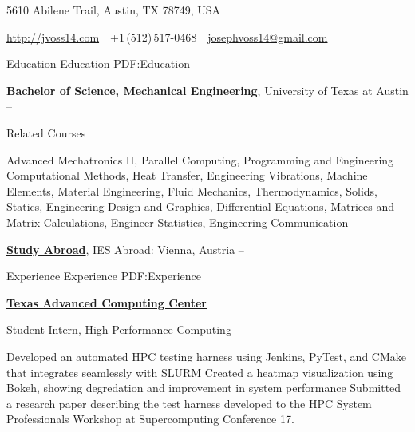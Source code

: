 \documentclass[letterpaper,MMMyyyy,nonstopmode]{simpleresumecv}
\newcommand{\CVAuthor}{Joseph Voss}
\newcommand{\CVWebpage}{http://jvoss14.com}
\begin{document}

\Title{\CVAuthor}

\begin{SubTitle}
{5610 Abilene Trail, Austin, TX 78749, USA}
\par
\href{\CVWebpage}
{\url{\CVWebpage}}
\,\SubBulletSymbol\,
+1\,(512)\,517-0468
\,\SubBulletSymbol\,
\href{mailto:josephvoss14@gmail.com}
{josephvoss14@gmail.com}

\end{SubTitle}

\begin{Body}


\Section
{Education}
{Education}
{PDF:Education}

\Entry
{\textbf{Bachelor of Science, Mechanical Engineering}},
University of Texas at Austin
\hfill
{} --

\Gap
\begin{center}
Related Courses
\end{center}
\Gap
\begin{Detail}
Advanced Mechatronics II, Parallel Computing, Programming and Engineering Computational Methods, Heat Transfer, Engineering Vibrations, Machine Elements, Material Engineering, Fluid Mechanics, Thermodynamics, Solids, Statics, Engineering Design and Graphics, Differential Equations, Matrices and Matrix Calculations, Engineer Statistics, Engineering Communication
\end{Detail}

\BigGap
\Entry
\href{http://www.example.com/my-college}
{\textbf{Study Abroad}},
IES Abroad: Vienna, Austria
\hfill
{} -- 


\Section
{Experience}
{Experience}
{PDF:Experience}

\Entry
\href{http://tacc.utexas.edu}
{\textbf{Texas Advanced Computing Center}}

\Gap
\BulletItem
Student Intern, High Performance Computing
\hfill
{} --
\begin{Detail}
\SubBulletItem
Developed an automated HPC testing harness using Jenkins, PyTest, and CMake \newline
that integrates seamlessly with SLURM
\SubBulletItem
Created a heatmap visualization using Bokeh, showing 
degredation  and improvement \newline in system performance
\SubBulletItem
Submitted a research paper describing the test harness developed\newline
to the HPC System Professionals Workshop at Supercomputing Conference 17.
\end{Detail}


\end{Body}
\end{document}
